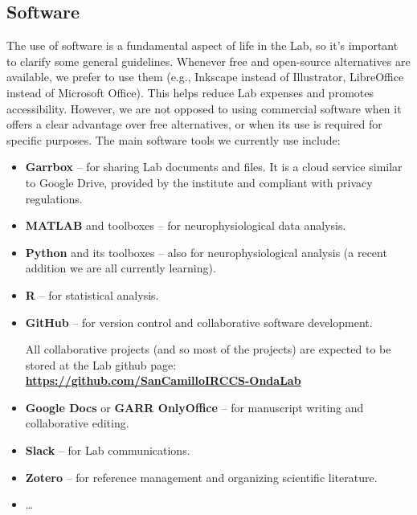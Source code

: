 \documentclass[12pt]{article}
\begin{document}
\subsection{Software}

The use of software is a fundamental aspect of life in the Lab, so it's important to clarify some general guidelines.
Whenever free and open-source alternatives are available, we prefer to use them (e.g., Inkscape instead of Illustrator, LibreOffice instead of Microsoft Office). 
This helps reduce Lab expenses and promotes accessibility. 
However, we are not opposed to using commercial software when it offers a clear advantage over free alternatives, or when its use is required for specific purposes.
The main software tools we currently use include:

\begin{itemize}
\item \textbf{Garrbox} -- for sharing Lab documents and files. It is a cloud service similar to Google Drive, provided by the institute and compliant with privacy regulations.
\item \textbf{MATLAB} and toolboxes -- for neurophysiological data analysis.
\item \textbf{Python} and its toolboxes -- also for neurophysiological analysis (a recent addition we are all currently learning).
\item \textbf{R} -- for statistical analysis.
\item \textbf{GitHub} -- for version control and collaborative software development. 

\begin{tcolorbox}[
    colback=red!5,
    colframe=red!70!black,
    boxrule=1pt,
    leftrule=4pt,
    arc=2pt,
colbacktitle=red!70!black,   %
    title={\textbf{Important}},
    fonttitle=\bfseries\color{red!0!white}
]
All collaborative projects (and so most of the projects) are expected to be stored at the Lab github page:  \\
\textbf{\url{https://github.com/SanCamilloIRCCS-OndaLab}}
\end{tcolorbox}



\item \textbf{Google Docs} or \textbf{GARR OnlyOffice} -- for manuscript writing and collaborative editing.
\item \textbf{Slack} -- for Lab communications.
\item \textbf{Zotero} -- for reference management and organizing scientific literature.
\item \ldots
\end{itemize}
\end{document}
